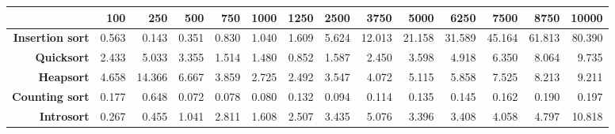 \begin{tabular}{rrrrrrrrrrrrrr}
\hline
                         &   \textbf{100} &   \textbf{250} &   \textbf{500} &   \textbf{750} &   \textbf{1000} &   \textbf{1250} &   \textbf{2500} &   \textbf{3750} &   \textbf{5000} &   \textbf{6250} &   \textbf{7500} &   \textbf{8750} &   \textbf{10000} \\
\hline
 \textbf{Insertion sort} &          0.563 &          0.143 &          0.351 &          0.830 &           1.040 &           1.609 &           5.624 &          12.013 &          21.158 &          31.589 &          45.164 &          61.813 &           80.390 \\
      \textbf{Quicksort} &          2.433 &          5.033 &          3.355 &          1.514 &           1.480 &           0.852 &           1.587 &           2.450 &           3.598 &           4.918 &           6.350 &           8.064 &            9.735 \\
       \textbf{Heapsort} &          4.658 &         14.366 &          6.667 &          3.859 &           2.725 &           2.492 &           3.547 &           4.072 &           5.115 &           5.858 &           7.525 &           8.213 &            9.211 \\
  \textbf{Counting sort} &          0.177 &          0.648 &          0.072 &          0.078 &           0.080 &           0.132 &           0.094 &           0.114 &           0.135 &           0.145 &           0.162 &           0.190 &            0.197 \\
      \textbf{Introsort} &          0.267 &          0.455 &          1.041 &          2.811 &           1.608 &           2.507 &           3.435 &           5.076 &           3.396 &           3.408 &           4.058 &           4.797 &           10.818 \\
\hline
\end{tabular}